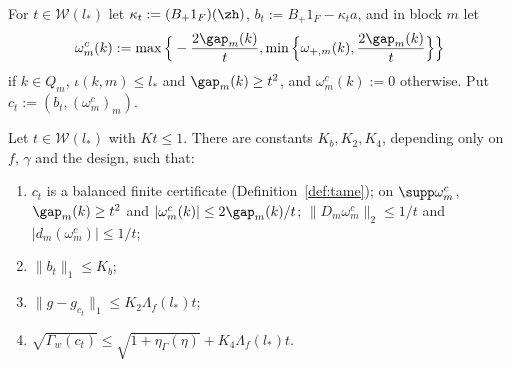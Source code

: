\begin{definition}\label{def:windowcert}
For $t\in\mathcal W(l_*)$ let $\kappa_t:=(B_+1_F)(\zh)$,
$b_t:=B_+1_F-\kappa_ta$, and in block $m$ let
\[
 \omega^c_m(k):=\max\Big\{-\frac{2\gap_m(k)}t,\min\Big\{\omega_{+,m}(k),
 \frac{2\gap_m(k)}t\Big\}\Big\}
\]
if $k\in Q_m$, $\iota(k,m)\le l_*$ and $\gap_m(k)\ge t^2$, and
$\omega^c_m(k):=0$ otherwise.  Put $c_t:=(b_t,(\omega^c_m)_m)$.
\end{definition}

\begin{proposition}\label{prop:windowcert}
Let $t\in\mathcal W(l_*)$ with $Kt\le1$.  There are constants $K_b,K_2,K_4$,
depending only on $f$, $\gamma$ and the design, such that:
\begin{enumerate}
\item[(a)] $c_t$ is a balanced finite certificate (Definition~\ref{def:tame});
on $\supp\omega^c_m$, $\gap_m(k)\ge t^2$ and $|\omega^c_m(k)|\le
2\gap_m(k)/t$; $\|D_m\omega^c_m\|_2\le1/t$ and $|d_m(\omega^c_m)|\le1/t$;
\item[(b)] $\|b_t\|_1\le K_b$;
\item[(c)] $\|g-g_{c_t}\|_1\le K_2\Lambda_f(l_*)t$;
\item[(d)] $\sqrt{\Gamma_w(c_t)}\le\sqrt{1+\eta_\Gamma(\eta)}+K_4\Lambda_f(l_*)t$.
\end{enumerate}
\end{proposition}

